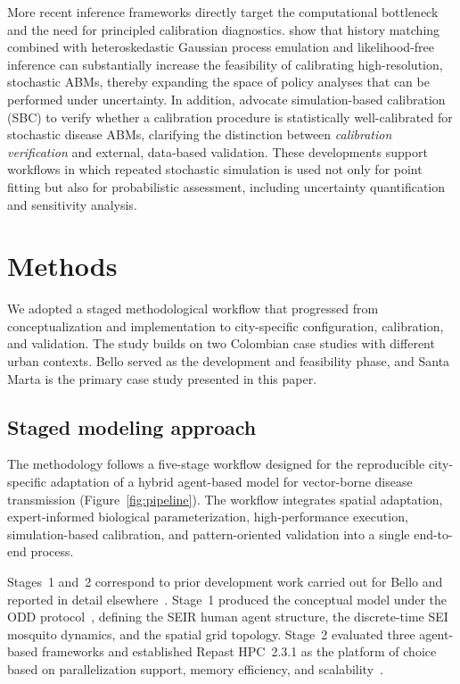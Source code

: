 \documentclass[applsci,article,accept,pdftex,moreauthors]{Definitions/mdpi}
\begin{document}
More recent inference frameworks directly target the computational bottleneck and the need for principled calibration diagnostics. \cite{OGara2025HistoryMatching} show that history matching combined with heteroskedastic Gaussian process emulation and likelihood-free inference can substantially increase the feasibility of calibrating high-resolution, stochastic ABMs, thereby expanding the space of policy analyses that can be performed under uncertainty. In addition, \cite{Horii2024SBCVerification} advocate simulation-based calibration (SBC) to verify whether a calibration procedure is statistically well-calibrated for stochastic disease ABMs, clarifying the distinction between \emph{calibration verification} and external, data-based validation. These developments support workflows in which repeated stochastic simulation is used not only for point fitting but also for probabilistic assessment, including uncertainty quantification and sensitivity analysis.

\section{Methods}
\label{sec:methods}

We adopted a staged methodological workflow that progressed from conceptualization and implementation to city-specific configuration, calibration, and validation. The study builds on two Colombian case studies with different urban contexts. Bello served as the development and feasibility phase, and Santa Marta is the primary case study presented in this paper.

\subsection{Staged modeling approach}
\label{sec:pipeline}

The methodology follows a five-stage workflow designed for the reproducible city-specific adaptation of a hybrid agent-based model for vector-borne disease transmission (Figure~\ref{fig:pipeline}). The workflow integrates spatial adaptation, expert-informed biological parameterization, high-performance execution, simulation-based calibration, and pattern-oriented validation into a single end-to-end process.

Stages~1 and~2 correspond to prior development work carried out for Bello and reported in detail elsewhere~\cite{escudero2023hybrid,uribe2023ccc}. Stage~1 produced the conceptual model under the ODD protocol~\cite{grimm2010odd}, defining the SEIR human agent structure, the discrete-time SEI mosquito dynamics, and the spatial grid topology. Stage~2 evaluated three agent-based frameworks and established Repast HPC~2.3.1 as the platform of choice based on parallelization support, memory efficiency, and scalability~\cite{uribe2023ccc}.
\end{document}

